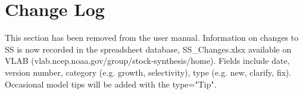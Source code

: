 \section{Change Log}

This section has been removed from the user manual.  Information on changes to SS is now recorded in the spreadsheet database, SS\_Changes.xlsx available on VLAB (vlab.ncep.noaa.gov/group/stock-synthesis/home).  Fields include date, version number, category (e.g. growth, selectivity), type (e.g. new, clarify, fix).  Occasional model tips will be added with the type="Tip".